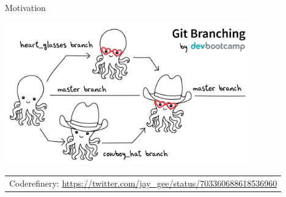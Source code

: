 \begin{frame}{Motivation}

\begin{center}
  \includegraphics[width=0.8\textwidth]{pics/merging_pic.jpg}
\end{center}



\tiny
\begin{tabular}{l}
Coderefinery: \url{https://twitter.com/jay_gee/status/703360688618536960}
\end{tabular}

\end{frame}
